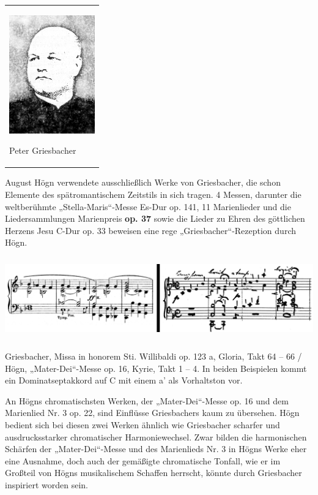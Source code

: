 \begin{center}
\begin{minipage}{4.076cm}
\begin{flushleft}
\tablefirsthead{}
\tablehead{}
\tabletail{}
\tablelasttail{}
\begin{supertabular}{m{3.8760002cm}}

\includegraphics[width=3.694cm,height=5.106cm]{pictures/zulassungsarbeit-img091.jpg}

Peter Griesbacher\\
\end{supertabular}
\end{flushleft}
\end{minipage}
\end{center}
August Högn verwendete ausschließlich Werke von Griesbacher, die schon
Elemente des spätromantischem Zeitstils in sich tragen. 4 Messen,
darunter die weltberühmte „Stella-Maris“-Messe Es-Dur op. 141, 11
Marienlieder und die Liedersammlungen Marienpreis \textbf{\textmd{op.
37} }sowie die Lieder zu Ehren des göttlichen Herzens Jesu C-Dur op. 33
beweisen eine rege „Griesbacher“-Rezeption durch Högn.


\includegraphics[width=15.977cm,height=3.53cm]{pictures/zulassungsarbeit-img092.png}


Griesbacher, Missa in honorem Sti.
Willibaldi op. 123 a, Gloria, Takt 64 – 66 / Högn, „Mater-Dei“-Messe
op. 16, Kyrie, Takt 1 – 4. In beiden Beispielen kommt ein
Dominatseptakkord auf C mit einem a’ als Vorhaltston vor.

An Högns chromatischsten Werken, der „Mater-Dei“-Messe op. 16 und dem
Marienlied Nr. 3 op. 22, sind Einflüsse Griesbachers kaum zu übersehen.
Högn bedient sich bei diesen zwei Werken ähnlich wie Griesbacher
scharfer und ausdrucksstarker chromatischer Harmoniewechsel. Zwar
bilden die harmonischen Schärfen der „Mater-Dei“-Messe und des
Marienlieds Nr. 3 in Högns Werke eher eine Ausnahme, doch auch der
gemäßigte chromatische Tonfall, wie er im Großteil von Högns
musikalischem Schaffen herrscht, könnte durch Griesbacher inspiriert
worden sein.

